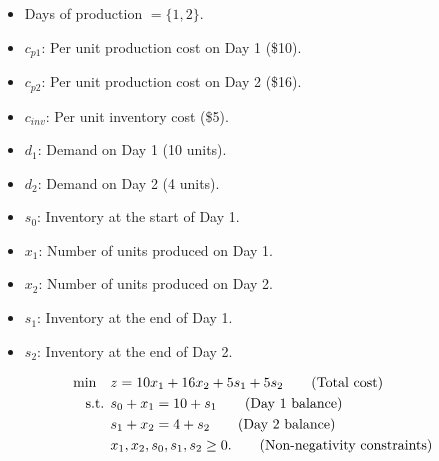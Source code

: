 \begin{solution}
\begin{itemize}
    \item Days of production $ = \{1, 2\}$.
\end{itemize}
\begin{itemize}
    \item $c_{p1}$: Per unit production cost on Day 1 (\$10).
    \item $c_{p2}$: Per unit production cost on Day 2 (\$16).
    \item $c_{inv}$: Per unit inventory cost (\$5).
    \item $d_1$: Demand on Day 1 (10 units).
    \item $d_2$: Demand on Day 2 (4 units).
        \item $s_0$: Inventory at the start of Day 1.
\end{itemize}

\begin{itemize}
    \item $x_1$: Number of units produced on Day 1.
    \item $x_2$: Number of units produced on Day 2.
    \item $s_1$: Inventory at the end of Day 1.
    \item $s_2$: Inventory at the end of Day 2.
\end{itemize}

\begin{align*}
\min \quad & z = 10x_1 + 16x_2 + 5s_1 + 5s_2   \tag{Total cost} \\
\text{ s.t. }        & s_0 + x_1 = 10 + s_1   \tag{Day 1 balance} \\
& s_1 + x_2 = 4 + s_2   \tag{Day 2 balance} \\
& x_1, x_2, s_0, s_1, s_2 \geq 0.   \tag{Non-negativity constraints}
\end{align*}

\end{solution}

